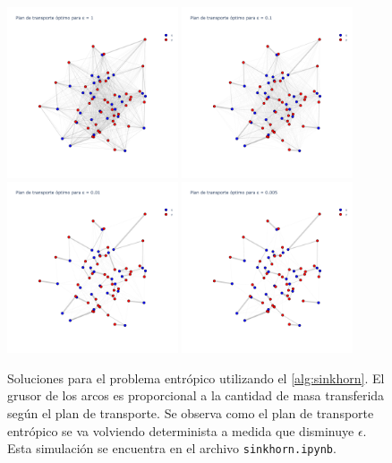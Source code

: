 \begin{figure}
	\centering
	\includegraphics[width=0.45\textwidth]{images/eot_sbp/discrete_sinkhorn_graph1}
	\includegraphics[width=0.45\textwidth]{images/eot_sbp/discrete_sinkhorn_graph0.1}
	\includegraphics[width=0.45\textwidth]{images/eot_sbp/discrete_sinkhorn_graph0.01}
	\includegraphics[width=0.45\textwidth]{images/eot_sbp/discrete_sinkhorn_graph0.005}
	\caption{Soluciones para el problema entrópico utilizando el \autoref{alg:sinkhorn}. El grusor de los arcos es proporcional a la cantidad de masa transferida según el plan de transporte. Se observa como el plan de transporte entrópico se va volviendo determinista a medida que disminuye $\epsilon$. Esta simulación se encuentra en el archivo \texttt{sinkhorn.ipynb}.}
	\label{fig:eot_sbp/discrete_sinkhorn_graph}
\end{figure}

